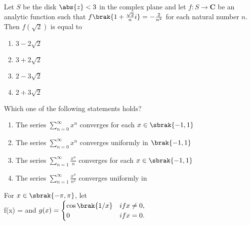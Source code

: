     \item Let  $S$ be the disk  $\abs{z} < 3$ in the complex plane and let $f : S \to \mathbf{C}$  be an analytic function such that
    $ f\brak{ 1 + \frac{\sqrt{2}}{n}i} = -\frac{2}{n^2}$ for each natural number $n$. Then $ f(\sqrt{2}) $ is equal to
    \begin{enumerate}
        \item $3 - 2\sqrt{2}$
        \item $3 + 2\sqrt{2}$
        \item $2 - 3\sqrt{2}$
        \item $2 + 3\sqrt{2}$
    \end{enumerate}
    \item Which one of the following statements holds?
    \begin{enumerate}
        \item The series $\sum_{n=0}^{\infty} x^n$ converges for each $x \in \sbrak{-1,1} $
        \item The series $\sum_{n=0}^{\infty} x^n$ converges uniformly in $\brak{-1, 1}$
        \item The series $\sum_{n=1}^{\infty} \frac{x^n}{n}$ converges for each $x \in \sbrak{-1,1}$
        \item The series $\sum_{n=1}^{\infty} \frac{x^n}{n^2}$ converges uniformly in 
    \end{enumerate}
    \item For $x \in \sbrak{-\pi, \pi}$, let
    \\
    f(x) =  and $g(x) = \begin{cases}
    \cos\brak{1/x} & if x \neq 0, \\
    0 & if x = 0.
    \end{cases}$
   
